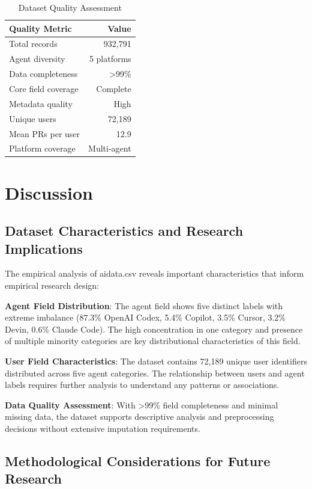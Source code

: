 \documentclass[conference]{IEEEtran}
\begin{document}
\begin{table}[t]
\centering
\caption{Dataset Quality Assessment}
\label{tab:quality_assessment}
\begin{tabular}{@{}lr@{}}
\toprule
\textbf{Quality Metric} & \textbf{Value} \\
\midrule
Total records & 932,791 \\
Agent diversity & 5 platforms \\
Data completeness & >99\% \\
Core field coverage & Complete \\
Metadata quality & High \\
Unique users & 72,189 \\
Mean PRs per user & 12.9 \\
Platform coverage & Multi-agent \\
\bottomrule
\end{tabular}
\end{table}

\section{Discussion}

\subsection{Dataset Characteristics and Research Implications}

The empirical analysis of aidata.csv reveals important characteristics that inform empirical research design:

\textbf{Agent Field Distribution}: The agent field shows five distinct labels with extreme imbalance (87.3\% OpenAI Codex, 5.4\% Copilot, 3.5\% Cursor, 3.2\% Devin, 0.6\% Claude Code). The high concentration in one category and presence of multiple minority categories are key distributional characteristics of this field.

\textbf{User Field Characteristics}: The dataset contains 72,189 unique user identifiers distributed across five agent categories. The relationship between users and agent labels requires further analysis to understand any patterns or associations.

\textbf{Data Quality Assessment}: With >99\% field completeness and minimal missing data, the dataset supports descriptive analysis and preprocessing decisions without extensive imputation requirements.

\subsection{Methodological Considerations for Future Research}
\end{document}
